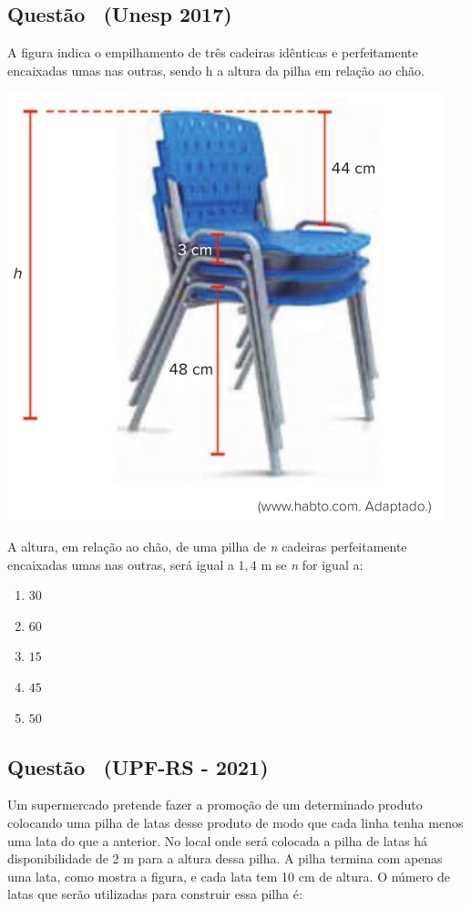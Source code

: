 \documentclass[12pt]{article}
\newif\ifmostravermelho
\newcommand{\vermelho}[1]{%
  \ifmostravermelho
    {\color{red}#1}%
  \else
    #1%
  \fi
}
\newcounter{questao}
\newcommand{\novaquestao}[1]{%
  \stepcounter{questao}%
  \subsection*{Questão \thequestao\ (#1)}%
}
\begin{document}
\begin{multicols}{2}
        \novaquestao{Unesp 2017}
            A figura indica o empilhamento de três cadeiras idênticas e perfeitamente encaixadas umas nas outras, sendo h a altura da pilha em relação ao chão.

            \begin{center}
                \includegraphics[scale=0.5]{q35.png}
            \end{center} A altura, em relação ao chão, de uma pilha de \textit{n} cadeiras perfeitamente encaixadas umas nas outras, será igual a $1,4$ m se \textit{n} for igual a:
        
            \begin{enumerate}[label=(\alph*), noitemsep]
                \item \vermelho{$30$} %
                \item $60$ 
                \item $15$  
                \item $45$  
                \item $50$
            \end{enumerate}

        \novaquestao{UPF-RS - 2021}
            Um supermercado pretende fazer a promoção de um determinado produto colocando uma pilha de latas desse produto de modo que cada linha tenha menos uma lata do que a anterior. No local onde será colocada a pilha de latas há disponibilidade de 2 m para a altura dessa pilha. 
            A pilha termina com apenas uma lata, como mostra a figura, e cada lata tem 10 cm de altura. O número de latas que serão utilizadas para construir essa pilha é:


\end{multicols}
\end{document}
